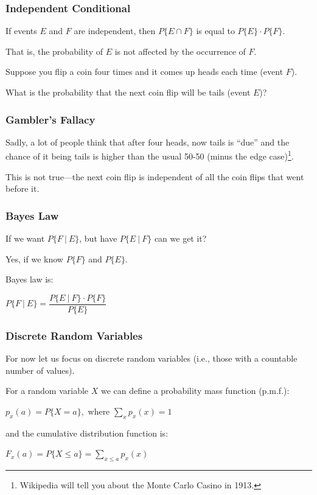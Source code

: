 \begin{frame}
\frametitle{Independent Conditional}

If events $E$ and $F$ are independent, then $P\{E \cap F\}$ is equal to $P\{E\} \cdot P\{F\}$. 

That is, the probability of $E$ is not affected by the occurrence of $F$. 

Suppose you flip a coin four times and it comes up heads each time (event $F$). 

What is the probability that the next coin flip will be tails (event $E$)?

\end{frame}



\begin{frame}
\frametitle{Gambler's Fallacy}

Sadly, a lot of people think that after four heads, now tails is ``due'' and the chance of it being tails is higher than the usual 50-50 (minus the edge case)\footnote{Wikipedia will tell you about the Monte Carlo Casino in 1913.}.

This is not true---the next coin flip is independent of all the coin flips that went before it.

\end{frame}



\begin{frame}
\frametitle{Bayes Law}

If we want $P\{ F~|~E \}$, but have $P\{ E~|~F \}$ can we get it? 

Yes, if we know $P\{F\}$ and $P\{E\}$. 

Bayes law is:

\begin{center}
	$P\{F~|~E\} = \dfrac{P\{E~|~F\} \cdot P\{F\}}{P\{E\}}$
\end{center}


\end{frame}



\begin{frame}
\frametitle{Discrete Random Variables}


For now let us focus on discrete random variables (i.e., those with a countable number of values). 

For a random variable $X$ we can define a probability mass function (p.m.f.):

\begin{center}
	$p_{x}(a) = P \{ X = a \},$ where $\sum\limits_{x}^{~} p_{x}(x) = 1$
\end{center}
	and the cumulative distribution function is:
\begin{center}
	$F_{x}(a) = P \{ X \leq a \} = \sum\limits_{x \leq a} p_{x}(x)$
\end{center}


\end{frame}



